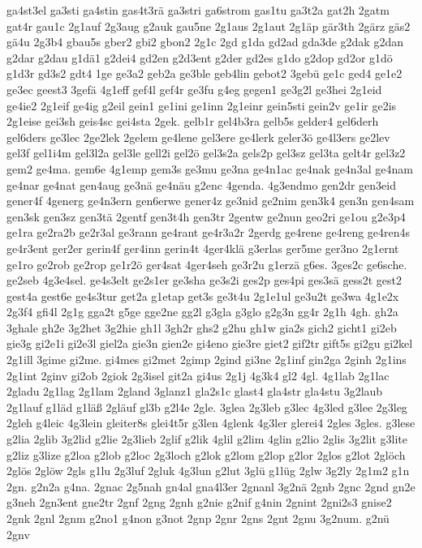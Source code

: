 {ga4st3el
ga3sti
ga4stin
gas4t3rä
ga3stri
ga6strom
gas1tu
ga3t2a
gat2h
2gatm
gat4r
gau1c
2g1auf
2g3aug
g2auk
gau5ne
2g1aus
2g1aut
2g1äp
gär3th
2gärz
gäs2
gä4u
2g3b4
gbau5s
gber2
gbi2
gbon2
2g1c
2gd
g1da
gd2ad
gda3de
g2dak
g2dan
g2dar
g2dau
g1dä1
g2dei4
gd2en
g2d3ent
g2der
gd2es
g1do
g2dop
gd2or
g1dö
g1d3r
gd3s2
gdt4
1ge
ge3a2
geb2a
ge3ble
geb4lin
gebot2
3gebü
ge1c
ged4
ge1e2
ge3ec
geest3
3gefä
4g1eff
gef4l
gef4r
ge3fu
g4eg
gegen1
ge3g2l
ge3hei
2g1eid
ge4ie2
2g1eif
ge4ig
g2eil
gein1
ge1ini
ge1inn
2g1einr
gein5sti
gein2v
ge1ir
ge2is
2g1eise
gei3sh
geis4sc
gei4sta
2gek.
gelb1r
gel4b3ra
gelb5s
gelder4
gel6derh
gel6ders
ge3lec
2ge2lek
2gelem
ge4lene
gel3ere
ge4lerk
geler3ö
ge4l3ers
ge2lev
gel3f
gel1i4m
gel3l2a
gel3le
gell2i
gel2ö
gel3s2a
gels2p
gel3sz
gel3ta
gelt4r
gel3z2
gem2
ge4ma.
gem6e
4g1emp
gem3s
ge3mu
ge3na
ge4n1ac
ge4nak
ge4n3al
ge4nam
ge4nar
ge4nat
gen4aug
ge3nä
ge4näu
g2enc
4genda.
4g3endmo
gen2dr
gen3eid
gener4f
4generg
ge4n3ern
gen6erwe
gener4z
ge3nid
ge2nim
gen3k4
gen3n
gen4sam
gen3sk
gen3sz
gen3tä
2gentf
gen3t4h
gen3tr
2gentw
ge2nun
geo2ri
ge1ou
g2e3p4
ge1ra
ge2ra2b
ge2r3al
ge3rann
ge4rant
ge4r3a2r
2gerdg
ge4rene
ge4reng
ge4ren4s
ge4r3ent
ger2er
gerin4f
ger4inn
gerin4t
4ger4klä
g3erlas
ger5me
ger3no
2g1ernt
ge1ro
ge2rob
ge2rop
ge1r2ö
ger4sat
4ger4seh
ge3r2u
g1erzä
g6es.
3ges2c
ge6sche.
ge2seb
4g3e4sel.
ge4s3elt
ge2s1er
ge3sha
ge3s2i
ges2p
ges4pi
ges3sä
gess2t
gest2
gest4a
gest6e
ge4s3tur
get2a
g1etap
get3s
ge3t4u
2g1e1ul
ge3u2t
ge3wa
4g1e2x
2g3f4
gfi4l
2g1g
gga2t
g5ge
gge2ne
gg2l
g3gla
g3glo
g2g3n
gg4r
2g1h
4gh.
gh2a
3ghale
gh2e
3g2het
3g2hie
gh1l
3gh2r
ghs2
g2hu
gh1w
gia2s
gich2
gicht1
gi2eb
gie3g
gi2e1i
gi2e3l
giel2a
gie3n
gien2e
gi4eno
gie3re
giet2
gif2tr
gift5s
gi2gu
gi2kel
2g1ill
3gime
gi2me.
gi4mes
gi2met
2gimp
2gind
gi3ne
2g1inf
gin2ga
2ginh
2g1ins
2g1int
2ginv
gi2ob
2giok
2g3isel
git2a
gi4us
2g1j
4g3k4
gl2
4gl.
4g1lab
2g1lac
2gladu
2g1lag
2g1lam
2gland
3glanz1
gla2s1c
glast4
gla4str
gla4stu
3g2laub
2g1lauf
g1läd
g1läß
2gläuf
gl3b
g2l4e
2gle.
3glea
2g3leb
g3lec
4g3led
g3lee
2g3leg
2gleh
g4leic
4g3lein
gleiter8s
glei4t5r
g3len
4glenk
4g3ler
glerei4
2gles
3gles.
g3lese
g2lia
2glib
3g2lid
g2lie
2g3lieb
2glif
g2lik
4glil
g2lim
4glin
g2lio
2glis
3g2lit
g3lite
g2liz
g3lize
g2loa
g2lob
g2loc
2g3loch
g2lok
g2lom
g2lop
g2lor
2glos
g2lot
2glöch
2glös
2glöw
2gls
g1lu
2g3luf
2gluk
4g3lun
g2lut
3glü
g1lüg
2glw
3g2ly
2g1m2
g1n
2gn.
g2n2a
g4na.
2gnac
2g5nah
gn4al
gna4l3er
2gnanl
3g2nä
2gnb
2gnc
2gnd
gn2e
g3neh
2gn3ent
gne2tr
2gnf
2gng
2gnh
g2nie
g2nif
g4nin
2gnint
2gni2s3
gnise2
2gnk
2gnl
2gnm
g2no1
g4non
g3not
2gnp
2gnr
2gns
2gnt
2gnu
3g2num.
g2nü
2gnv
}
